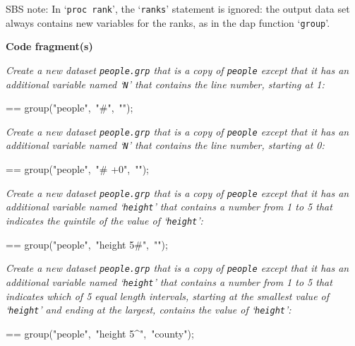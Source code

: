 \documentclass{book}
\makeatletter
\newenvironment{Texinfopreformatted}{%
  \par\GNUTobeylines\obeyspaces\frenchspacing\parskip=\z@\parindent=\z@}{}
{\catcode`\^^M=13 \gdef\GNUTobeylines{\catcode`\^^M=13 \def^^M{\null\par}}}
\newenvironment{Texinfoindented}{\begin{list}{}{}\item\relax}{\end{list}}
\renewcommand{\_}{\Texinfounderscore\discretionary{}{}{}}
\makeatother
\begin{document}
SBS note: In `\texttt{proc rank}', the `\texttt{ranks}' statement is ignored: the output data
set always contains new variables for the ranks, as in
the dap function `\texttt{group}'.

\noindent{}\textbf{Code fragment(s)}

\emph{Create a new dataset \texttt{people.grp} that is a copy of
\texttt{people} except that it has an additional variable named
`\texttt{\_N\_}' that contains the line number, starting at 1:}
\begin{Texinfoindented}
\begin{Texinfopreformatted}%
\ttfamily group("people",\ "\#",\ "");
\end{Texinfopreformatted}
\end{Texinfoindented}

\emph{Create a new dataset \texttt{people.grp} that is a copy of
\texttt{people} except that it has an additional variable named
`\texttt{\_N\_}' that contains the line number, starting at 0:}
\begin{Texinfoindented}
\begin{Texinfopreformatted}%
\ttfamily group("people",\ "\# +0",\ "");
\end{Texinfopreformatted}
\end{Texinfoindented}

\emph{Create a new dataset \texttt{people.grp} that is a copy of
\texttt{people} except that it has an additional variable named
`\texttt{\_height}' that contains a number from 1 to 5 that indicates
the quintile of the value of `\texttt{height}':}
\begin{Texinfoindented}
\begin{Texinfopreformatted}%
\ttfamily group("people",\ "height 5\#",\ "");
\end{Texinfopreformatted}
\end{Texinfoindented}

\emph{Create a new dataset \texttt{people.grp} that is a copy of
\texttt{people} except that it has an additional variable named
`\texttt{\_height}' that contains a number from 1 to 5 that indicates
which of 5 equal length intervals, starting at the smallest value
of `\texttt{height}' and ending at the largest,
contains the value of `\texttt{height}':}
\begin{Texinfoindented}
\begin{Texinfopreformatted}%
\ttfamily group("people",\ "height 5\^{}",\ "county");
\end{Texinfopreformatted}
\end{Texinfoindented}
\end{document}
